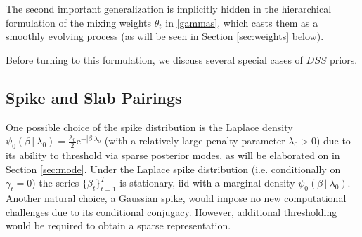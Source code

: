 \documentclass[ba]{imsart}
\numberwithin{equation}{section}
\theoremstyle{plain}
\newcommand{\E}{\mathsf{E\,}}
\newcommand{\mF}{\mathcal{F}}
\newcommand{\var}{\mathsf{Var}\,}
\def\C {\,|\:}
\def\C {\,|\:}
\newcommand{\e}{\mathrm{e}}
\begin{document}
  
 The second important  generalization is implicitly hidden in the  hierarchical formulation of the mixing weights $\theta_t$ in \eqref{gammas}, which casts them as a smoothly evolving process (as will be seen in Section \ref{sec:weights}  below).
\iffalse
Before turning to this formulation, however, it is worthwhile to point out the time-varying conditional moments of $DSS$,   given the past values $\mF_{t-1}$ after margining over $\gamma_t$:
$
\E[\beta_{t}\C\beta_{t-1}]=\theta_t[\phi_0+\sum_{k=1}^q\phi_k\beta_{t-k}]
$
and
$\var[\beta_{t}\C\beta_{t-1}]=(1-\theta_t)\frac{2}{\lambda_0^2}+\theta_t\lambda_1+(1-\theta_t)\theta_t\mu_t^2. $
\fi
Before turning to this formulation, we discuss several special cases of $DSS$ priors.



\subsection{Spike and Slab Pairings}\label{sec:other}
One possible choice of the spike distribution is the  Laplace density $\psi_0(\beta\C\lambda_0)=\frac{\lambda_0}{2}\e^{-|\beta|\lambda_0}$ (with a relatively large penalty parameter $\lambda_0>0$) due to its ability to threshold  via sparse posterior modes, as will be elaborated on in Section \ref{sec:mode}. {Under the Laplace spike distribution (i.e. conditionally on $\gamma_t=0$) the series $\{\beta_t\}_{t=1}^T$ is  stationary, iid with a marginal density $\psi_0(\beta\C\lambda_0)$.}  
Another natural choice, a Gaussian spike, would impose no new computational challenges due to its conditional conjugacy. However,  additional thresholding would be required to obtain a sparse representation. %
\end{document}

